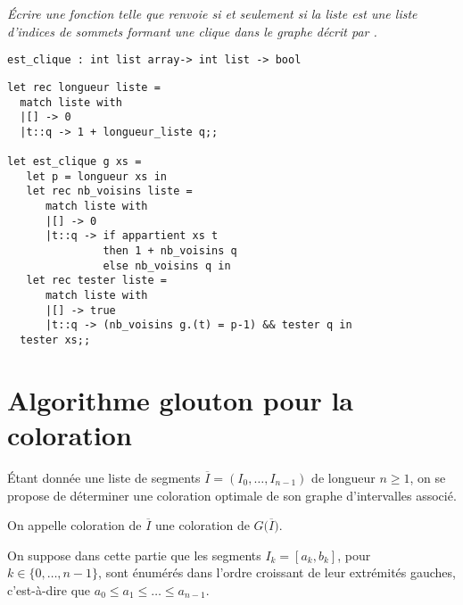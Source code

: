 \begin{Exercise}\it
Écrire une fonction  telle que  renvoie  si et seulement si la liste  est une liste d'indices de sommets formant une clique dans le graphe
décrit par .
\end{Exercise}  
\begin{lstlisting}
est_clique : int list array-> int list -> bool
\end{lstlisting}
\begin{Answer}
\begin{lstlisting}
let rec longueur liste =
  match liste with
  |[] -> 0
  |t::q -> 1 + longueur_liste q;;
 
let est_clique g xs =
   let p = longueur xs in
   let rec nb_voisins liste = 
      match liste with
      |[] -> 0
      |t::q -> if appartient xs t
               then 1 + nb_voisins q
               else nb_voisins q in
   let rec tester liste =
      match liste with
      |[] -> true
      |t::q -> (nb_voisins g.(t) = p-1) && tester q in
  tester xs;; 
\end{lstlisting} 
\end{Answer}
\section{Algorithme glouton pour la coloration}
Étant donnée une liste de segments $\overline{I}=(I_0,\dots,I_{n-1})$
de longueur $n\ge  1$, on se propose de déterminer une coloration
optimale de son graphe d'intervalles associé. 

On appelle coloration de $\overline{I}$ une coloration de $G\bigl(\overline I\bigr)$.

On suppose dans cette partie que les segments $I_k=[a_k,b_k]$, pour
$k\in \{0,\dots,n-1\}$, sont énumérés dans l'ordre croissant de leur
extrémités gauches, c'est-à-dire que $a_0\le a_1\le \dots\le a_{n-1}$.

